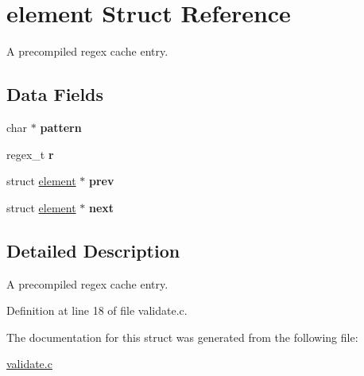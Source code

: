 \hypertarget{structelement}{
\section{element Struct Reference}
\label{structelement}
}


A precompiled regex cache entry.  


\subsection*{Data Fields}
\begin{DoxyCompactItemize}
\item 
\hypertarget{structelement_a7ca950ab7bd46e2a8e4bf64907b2b401}{
char $\ast$ {\bfseries pattern}}
\label{structelement_a7ca950ab7bd46e2a8e4bf64907b2b401}

\item 
\hypertarget{structelement_a730c3e55f827e9d334dc966463c4de00}{
regex\_\-t {\bfseries r}}
\label{structelement_a730c3e55f827e9d334dc966463c4de00}

\item 
\hypertarget{structelement_aaf80196504c482cab0ac5fd111348cf9}{
struct \hyperlink{structelement}{element} $\ast$ {\bfseries prev}}
\label{structelement_aaf80196504c482cab0ac5fd111348cf9}

\item 
\hypertarget{structelement_aaafe0042496c2573c14b8f5c6be41edb}{
struct \hyperlink{structelement}{element} $\ast$ {\bfseries next}}
\label{structelement_aaafe0042496c2573c14b8f5c6be41edb}

\end{DoxyCompactItemize}


\subsection{Detailed Description}
A precompiled regex cache entry. 

Definition at line 18 of file validate.c.



The documentation for this struct was generated from the following file:\begin{DoxyCompactItemize}
\item 
\hyperlink{validate_8c}{validate.c}\end{DoxyCompactItemize}
